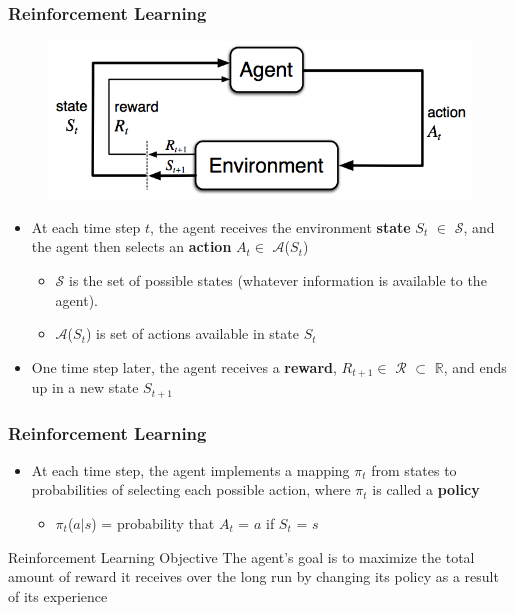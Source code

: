 \documentclass{beamer}
\begin{document}
\begin{frame}
\frametitle{Reinforcement Learning}

\begin{figure}[t]
\includegraphics[scale=0.3]{AgentEnvironment}
\centering
\end{figure}

\begin{itemize}
\item At each time step $t$, the agent receives the environment \textbf{state} $S_t$ $\in$ $\mathscr{S}$, 
 and the agent then selects an \textbf{action} $A_t \in$ $\mathscr{A}$($S_t$) 
   \begin{itemize}
   	\item $\mathscr{S}$ is the set of possible states (whatever information is available to the agent).
        \item $\mathscr{A}$($S_t$) is set of actions available in state $S_t$
      \end{itemize}
\item One time step later, the agent receives a \textbf{reward}, $R_{t+1} \in$ $\mathscr{R}$ $\subset$ $\mathbb{R}$,
and ends up in a new state $S_{t+1}$
\end{itemize}
\end{frame}


\begin{frame}
\frametitle{Reinforcement Learning}
\begin{itemize}
\item At each time step, the agent implements a mapping $\pi_t$ from states to probabilities of selecting each possible action, where $\pi_t$ is called a \textbf{policy}
   \begin{itemize}
   	\item $\pi_t$($a|s$) = probability that $A_t$ = $a$ if $S_t$ = $s$
      \end{itemize}
\end{itemize}
\begin{block}{Reinforcement Learning Objective}
The agent's goal is to maximize the total amount of reward it receives over the long run by changing its policy as a result of its experience
\end{block}
\end{frame}
\end{document}
